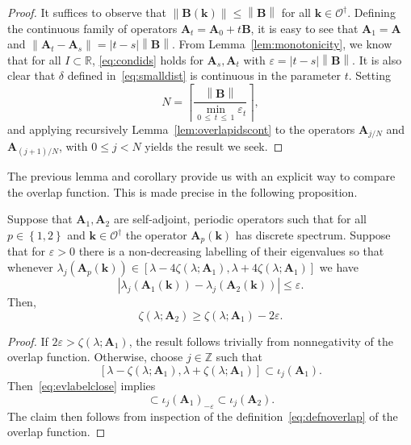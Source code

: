 \documentclass[10pt]{amsart}
\theoremstyle{definition}\newtheorem{defi}[theo]{Definition}\newtheorem{rema}[theo]{Remark}\newtheorem{exam}[theo]{Example}\newtheorem{nota}[theo]{Notation}
\newcommand{\R}{\mathbb R}
\newcommand{\Z}{\mathbb Z}
\newcommand{\CO}{\mathcal{O}}
\newcommand{\BA}{\mathbf A}
\newcommand{\BB}{\mathbf B}
\newcommand{\bk}{\mathbf k}
\newcommand{\eps}{\varepsilon}
\newcommand{\ceil}[1]{\left\lceil#1\right\rceil}
\newcommand{\abs}[1]{\left\lvert #1 \right\rvert}
\newcommand{\set}[1]{\left\{ #1 \right\}}
\newcommand{\norm}[1]{\left\| #1 \right\|}
\begin{document}
\begin{proof}
It suffices to observe that $\norm{\BB(\bk)} \le \norm{\BB}$ for all $\bk \in
\CO^\dagger$. Defining the continuous family of operators $\BA_t = \BA_0 + t \BB$, it is easy to see that $\BA_1 = \BA$ and $\norm{\BA_t - \BA_s} = \abs{t-s}\norm \BB$. From Lemma~\ref{lem:monotonicity}, we know that for all $I \subset \R$, \eqref{eq:condids} holds for $\BA_s,\BA_t$ with $\eps = \abs{t-s}\norm \BB$. It is also clear that $\delta$ defined in~\eqref{eq:smalldist} is continuous in the parameter $t$. Setting
\begin{equation}
N = \ceil{\frac{\norm \BB}{\min_{0\,\le\,t \,\le\,1} \eps_t}},
\end{equation}
and applying recursively Lemma~\ref{lem:overlapidscont} to the operators $\BA_{j/N}$ and $\BA_{(j+1)/N}$, with $0 \le j < N$ yields the result we seek.
\end{proof}

The previous lemma and corollary provide us with an explicit way to compare the overlap function. This is made precise in the following proposition.

\begin{prop}\label{prop:overlapcontev}
Suppose that $\BA_1,\BA_2$ are self-adjoint, periodic operators such that for all $p \in \set{1,2}$ and $\bk \in \CO^\dagger$ the operator $\BA_p(\bk)$ has discrete spectrum. Suppose that for $\eps > 0$ there is a non-decreasing labelling of their eigenvalues so that whenever $\lambda_j(\BA_p(\bk)) \in [\lambda - 4\zeta(\lambda;\BA_1), \lambda + 4\zeta(\lambda;\BA_1)]$ we have
\begin{equation}\label{eq:evlabelclose}
\left|\lambda_j(\BA_1(\bk)) - \lambda_j(\BA_2(\bk))\right| \le \eps.
\end{equation}
Then,
\begin{equation}
\zeta(\lambda;\BA_2) \ge \zeta(\lambda;\BA_1) - 2\eps.
\end{equation}
\end{prop}

\begin{proof}
If $2\eps > \zeta(\lambda;\BA_1)$, the result follows trivially from nonnegativity of the overlap function. Otherwise, choose $j \in \Z$ such that
\[
\left[\lambda -
\zeta(\lambda;\BA_1),\lambda + \zeta(\lambda;\BA_1)\right] \subset \iota_j(\BA_1).
\]
Then~\eqref{eq:evlabelclose} implies
\begin{equation}
[\lambda - \zeta(\lambda;\BA_1) + \eps,\lambda + \zeta(\lambda;\BA_1) - \eps]
\subset \iota_j(\BA_1)_{-\eps} \subset \iota_j(\BA_2).
\end{equation}
The claim then follows from inspection of the definition~\eqref{eq:defnoverlap} of the overlap function.
\end{proof}
\end{document}
